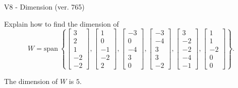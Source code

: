 \begin{exercise}
  \begin{exerciseTitle}V8 - Dimension (ver. 765)\end{exerciseTitle}
  \begin{exerciseStatement}
    Explain how to find the dimension of 
\[W=\mathrm{span}\ \left\{\left[\begin{array}{r}
3 \\
2 \\
1 \\
-2 \\
-2
\end{array}\right] , \left[\begin{array}{r}
1 \\
0 \\
-1 \\
-2 \\
2
\end{array}\right] , \left[\begin{array}{r}
-3 \\
0 \\
-4 \\
3 \\
0
\end{array}\right] , \left[\begin{array}{r}
-3 \\
-4 \\
3 \\
3 \\
-2
\end{array}\right] , \left[\begin{array}{r}
3 \\
-2 \\
-2 \\
-4 \\
-1
\end{array}\right] , \left[\begin{array}{r}
1 \\
1 \\
-2 \\
0 \\
0
\end{array}\right]\right\}.\]



  \end{exerciseStatement}
  \begin{exerciseAnswer}
   The dimension of \(W\) is  \(5\).
  


  \end{exerciseAnswer}
\end{exercise}